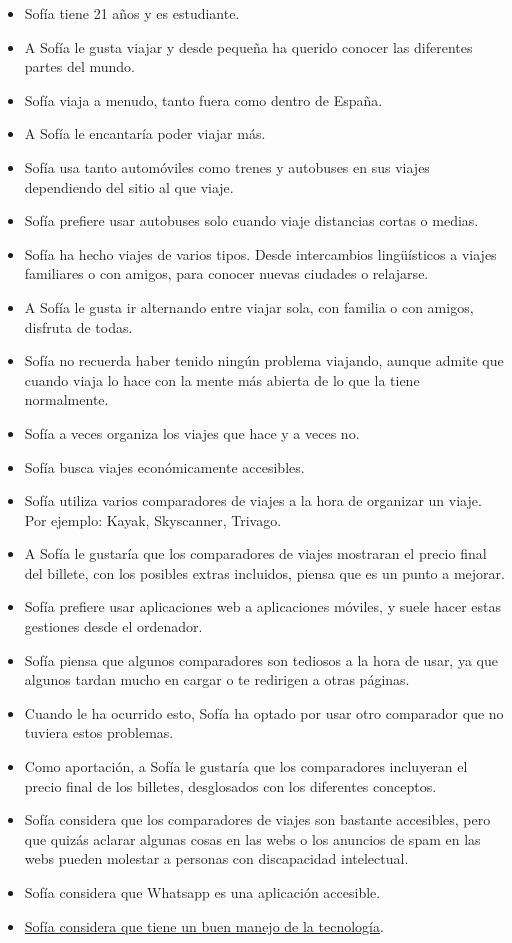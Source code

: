 \begin{itemize}
    \item Sofía tiene 21 años y es estudiante.
    \item A Sofía le gusta viajar y desde pequeña ha querido conocer las diferentes partes del mundo.
    \item Sofía viaja a menudo, tanto fuera como dentro de España.
    \item A Sofía le encantaría poder viajar más.
    \item Sofía usa tanto automóviles como trenes y autobuses en sus viajes dependiendo del sitio al que viaje.
    \item Sofía prefiere usar autobuses solo cuando viaje distancias cortas o medias.
    \item Sofía ha hecho viajes de varios tipos. Desde intercambios lingüísticos a viajes familiares o con amigos, para conocer nuevas ciudades o relajarse.
    \item A Sofía le gusta ir alternando entre viajar sola, con familia o con amigos, disfruta de todas.
    \item Sofía no recuerda haber tenido ningún problema viajando, aunque admite que cuando viaja lo hace con la mente más abierta de lo que la tiene normalmente.
    \item Sofía a veces organiza los viajes que hace y a veces no.
    \item Sofía busca viajes económicamente accesibles.
    \item Sofía utiliza varios comparadores de viajes a la hora de organizar un viaje. Por ejemplo: Kayak, Skyscanner, Trivago.
    \item A Sofía le gustaría que los comparadores de viajes mostraran el precio final del billete, con los posibles extras incluidos, piensa que es un punto a mejorar.
    \item Sofía prefiere usar aplicaciones web a aplicaciones móviles, y suele hacer estas gestiones desde el ordenador.
    \item Sofía piensa que algunos comparadores son tediosos a la hora de usar, ya que algunos tardan mucho en cargar o te redirigen a otras páginas.
    \item Cuando le ha ocurrido esto, Sofía ha optado por usar otro comparador que no tuviera estos problemas.
    \item Como aportación, a Sofía le gustaría que los comparadores incluyeran el precio final de los billetes, desglosados con los diferentes conceptos.
    \item Sofía considera que los comparadores de viajes son bastante accesibles, pero que quizás aclarar algunas cosas en las webs o los anuncios de spam en las webs pueden molestar a personas con discapacidad intelectual.
    \item Sofía considera que Whatsapp es una aplicación accesible.
    \item \underline{Sofía considera que tiene un buen manejo de la tecnología}.
\end{itemize}



